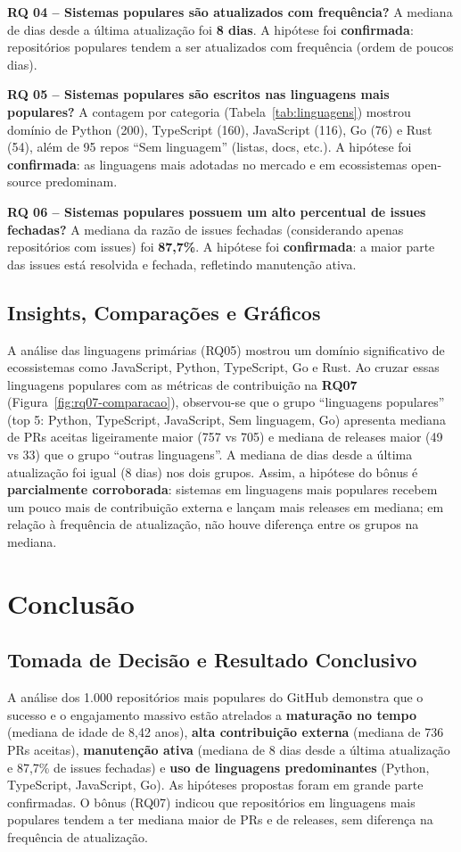 \documentclass[12pt,a4paper]{article}
\begin{document}
\textbf{RQ 04 -- Sistemas populares são atualizados com frequência?} A mediana de dias desde a última atualização foi \textbf{8 dias}. A hipótese foi \textbf{confirmada}: repositórios populares tendem a ser atualizados com frequência (ordem de poucos dias).

\textbf{RQ 05 -- Sistemas populares são escritos nas linguagens mais populares?} A contagem por categoria (Tabela~\ref{tab:linguagens}) mostrou domínio de Python (200), TypeScript (160), JavaScript (116), Go (76) e Rust (54), além de 95 repos ``Sem linguagem'' (listas, docs, etc.). A hipótese foi \textbf{confirmada}: as linguagens mais adotadas no mercado e em ecossistemas open-source predominam.

\textbf{RQ 06 -- Sistemas populares possuem um alto percentual de issues fechadas?} A mediana da razão de issues fechadas (considerando apenas repositórios com issues) foi \textbf{87,7\%}. A hipótese foi \textbf{confirmada}: a maior parte das issues está resolvida e fechada, refletindo manutenção ativa.

\subsection*{Insights, Comparações e Gráficos}

A análise das linguagens primárias (RQ05) mostrou um domínio significativo de ecossistemas como JavaScript, Python, TypeScript, Go e Rust. Ao cruzar essas linguagens populares com as métricas de contribuição na \textbf{RQ07} (Figura~\ref{fig:rq07-comparacao}), observou-se que o grupo ``linguagens populares'' (top 5: Python, TypeScript, JavaScript, Sem linguagem, Go) apresenta mediana de PRs aceitas ligeiramente maior (757 vs 705) e mediana de releases maior (49 vs 33) que o grupo ``outras linguagens''. A mediana de dias desde a última atualização foi igual (8 dias) nos dois grupos. Assim, a hipótese do bônus é \textbf{parcialmente corroborada}: sistemas em linguagens mais populares recebem um pouco mais de contribuição externa e lançam mais releases em mediana; em relação à frequência de atualização, não houve diferença entre os grupos na mediana.

\section{Conclusão}

\subsection*{Tomada de Decisão e Resultado Conclusivo}
A análise dos 1.000 repositórios mais populares do GitHub demonstra que o sucesso e o engajamento massivo estão atrelados a \textbf{maturação no tempo} (mediana de idade de 8,42 anos), \textbf{alta contribuição externa} (mediana de 736 PRs aceitas), \textbf{manutenção ativa} (mediana de 8 dias desde a última atualização e 87,7\% de issues fechadas) e \textbf{uso de linguagens predominantes} (Python, TypeScript, JavaScript, Go). As hipóteses propostas foram em grande parte confirmadas. O bônus (RQ07) indicou que repositórios em linguagens mais populares tendem a ter mediana maior de PRs e de releases, sem diferença na frequência de atualização.
\end{document}
